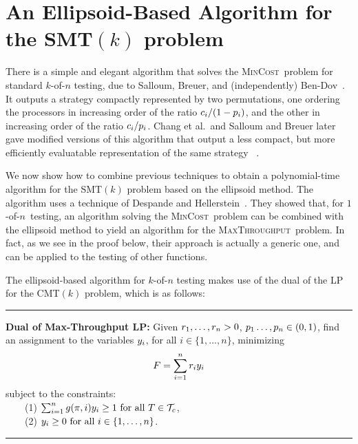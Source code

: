 \documentclass{article}
\newcounter{ass}
\newcommand{\ens}[1]{\ensuremath{#1}}					\newcommand{\card}[1]{\ens{|#1|}}							\newcommand{\dotlist}[2]{\ens{#1,\ldots,#2}}
\newcommand{\valn}{\ens{n}}
\newcommand{\valk}{\ens{k}}
\newcommand{\maxthru}{\textsc{MaxThroughput}}
\newcommand{\mincost}{\textsc{MinCost}}
\newcommand{\kofn}{\valk-of-\valn}
\newcommand{\oneofn}{$1$-of-\valn}
\newcommand{\thruput}{\ens{F}}
\newcommand{\processor}{processor}
\newcommand{\smt}{\textsf{SMT}$(\valk)$ problem}				\newcommand{\cmt}{\textsf{CMT}$(\valk)$ problem}
\begin{document}
\section{An Ellipsoid-Based Algorithm for the \smt}
\label{sec:smt}



There is a simple and elegant algorithm that solves the
\mincost\ problem for standard \kofn{} testing, due to 
Salloum, Breuer, and
(independently) Ben-Dov~\cite{salloumphd,salloumbreuer,bendov81}.
It outputs a strategy compactly
represented by two permutations,
one ordering the {\processor}s in increasing order of
the ratio
$\cost i/(1-\pr i)$, and the other  
in increasing order of the ratio
$\cost i/\pr i$.  
Chang et al.~and Salloum and Breuer later gave 
modified versions of this algorithm that
output a less compact,
but more efficiently evaluatable
representation of the same strategy
~\cite{salloumfaster,journals/tc/ChangSF90}.



We now show
how to combine previous techniques 
to obtain a polynomial-time algorithm for the \smt{} based on the ellipsoid method.  The algorithm uses a technique of 
Despande and Hellerstein~\cite{DBLP:journals/talg/DeshpandeH12}.
They showed that, for \oneofn\ testing, an algorithm
solving the \mincost\ problem can be combined with the ellipsoid
method to yield an algorithm for the \maxthru\ problem.
In fact, 
as we see in the proof below, their approach is actually a
generic one, and can be applied to the testing of other functions.

The ellipsoid-based algorithm for \kofn{} testing makes use of the dual of the LP for the \cmt, which
is as follows:

\vspace{6pt}
\hrule
\vspace{6pt}
{\bf \noindent Dual of Max-Throughput LP:}
Given $\rate 1, \ldots, \rate{\valn} > 0$, $\pr 1 \ldots, \pr{\valn} \in (0,1)$,
find an assignment to the variables $\vary{i}$, for all $i \in \{1, \ldots, n\}$, 
minimizing
$$\thruput = \sum_{i=1}^{n} \rate i \vary{i}$$
subject to the constraints: \\[3pt]
\mbox{\ \ \ \ }(1) $\sum_{i=1}^{n} g(\perm, i)\vary{i} \geq 1 \mbox{ for all }T \in 
\stratspacec$,\\[3pt]
\mbox{\ \ \ \ }(2) $\vary{i} \geq 0 \mbox{ for all }i \in \{1, \ldots, n\}$.\\
\vspace{6pt}
\hrule
\vspace{10pt}
\end{document}
